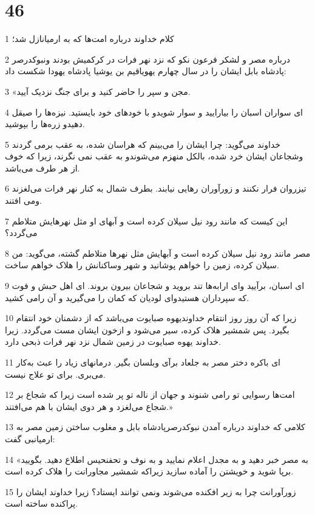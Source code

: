 \chapter{46}

\par 1 کلام خداوند درباره امت‌ها که به ارمیانازل شد؛
\par 2 درباره مصر و لشکر فرعون نکو که نزد نهر فرات در کرکمیش بودند ونبوکدرصر پادشاه بابل ایشان را در سال چهارم یهویاقیم بن یوشیا پادشاه یهودا شکست داد:
\par 3 «مجن و سپر را حاضر کنید و برای جنگ نزدیک آیید.
\par 4 ‌ای سواران اسبان را بیارایید و سوار شویدو با خودهای خود بایستید. نیزه‌ها را صیقل دهیدو زره‌ها را بپوشید. 
\par 5 خداوند می‌گوید: چرا ایشان را می‌بینم که هراسان شده، به عقب برمی گردند وشجاعان ایشان خرد شده، بالکل منهزم می‌شوندو به عقب نمی نگرند، زیرا که خوف از هر طرف می‌باشد.
\par 6 تیزروان فرار نکنند و زورآوران رهایی نیابند. بطرف شمال به کنار نهر فرات می‌لغزند ومی افتند.
\par 7 این کیست که مانند رود نیل سیلان کرده است و آبهای او مثل نهرهایش متلاطم می‌گردد؟
\par 8 مصر مانند رود نیل سیلان کرده است و آبهایش مثل نهرها متلاطم گشته، می‌گوید: من سیلان کرده، زمین را خواهم پوشانید و شهر وساکنانش را هلاک خواهم ساخت.
\par 9 ‌ای اسبان، برآیید و‌ای ارابه‌ها تند بروید و شجاعان بیرون بروند. ای اهل حبش و فوت که سپرداران هستیدو‌ای لودیان که کمان را می‌گیرید و آن رامی کشید.
\par 10 زیرا که آن روز روز انتقام خداوندیهوه صبایوت می‌باشد که از دشمنان خود انتقام بگیرد. پس شمشیر هلاک کرده، سیر می‌شود و ازخون ایشان مست می‌گردد. زیرا خداوند یهوه صبایوت در زمین شمال نزد نهر فرات ذبحی دارد.
\par 11 ‌ای باکره دختر مصر به جلعاد برآی وبلسان بگیر. درمانهای زیاد را عبث به‌کار می‌بری. برای تو علاج نیست.
\par 12 امت‌ها رسوایی تو رامی شنوند و جهان از ناله تو پر شده است زیرا که شجاع بر شجاع می‌لغزد و هر دوی ایشان با هم می‌افتند.»
\par 13 کلامی که خداوند درباره آمدن نبوکدرصرپادشاه بابل و مغلوب ساختن زمین مصر به ارمیانبی گفت:
\par 14 «به مصر خبر دهید و به مجدل اعلام نمایید و به نوف و تحفنحیس اطلاع دهید. بگویید برپا شوید و خویشتن را آماده سازید زیراکه شمشیر مجاورانت را هلاک کرده است.
\par 15 زورآورانت چرا به زیر افکنده می‌شوند ونمی توانند ایستاد؟ زیرا خداوند ایشان را پراکنده ساخته است.
